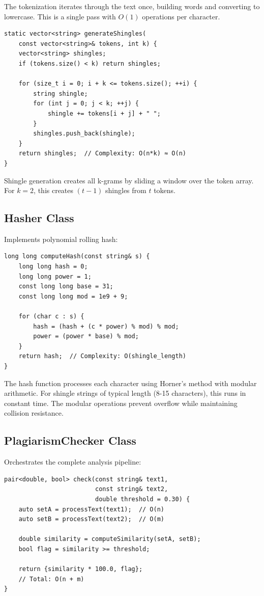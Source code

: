 \documentclass[12pt,oneside,openany]{report}
\begin{document}
The tokenization iterates through the text once, building words and converting to lowercase. This is a single pass with $O(1)$ operations per character.

\begin{lstlisting}
static vector<string> generateShingles(
    const vector<string>& tokens, int k) {
    vector<string> shingles;
    if (tokens.size() < k) return shingles;
    
    for (size_t i = 0; i + k <= tokens.size(); ++i) {
        string shingle;
        for (int j = 0; j < k; ++j) {
            shingle += tokens[i + j] + " ";
        }
        shingles.push_back(shingle);
    }
    return shingles;  // Complexity: O(n*k) ≈ O(n)
}
\end{lstlisting}

Shingle generation creates all k-grams by sliding a window over the token array. For $k=2$, this creates $(t-1)$ shingles from $t$ tokens.

\subsection{Hasher Class}

Implements polynomial rolling hash:

\begin{lstlisting}
long long computeHash(const string& s) {
    long long hash = 0;
    long long power = 1;
    const long long base = 31;
    const long long mod = 1e9 + 9;
    
    for (char c : s) {
        hash = (hash + (c * power) % mod) % mod;
        power = (power * base) % mod;
    }
    return hash;  // Complexity: O(shingle_length)
}
\end{lstlisting}

The hash function processes each character using Horner's method with modular arithmetic. For shingle strings of typical length (8-15 characters), this runs in constant time. The modular operations prevent overflow while maintaining collision resistance.

\subsection{PlagiarismChecker Class}

Orchestrates the complete analysis pipeline:

\begin{lstlisting}
pair<double, bool> check(const string& text1,
                         const string& text2,
                         double threshold = 0.30) {
    auto setA = processText(text1);  // O(n)
    auto setB = processText(text2);  // O(m)
    
    double similarity = computeSimilarity(setA, setB);
    bool flag = similarity >= threshold;
    
    return {similarity * 100.0, flag};  
    // Total: O(n + m)
}
\end{lstlisting}
\end{document}
